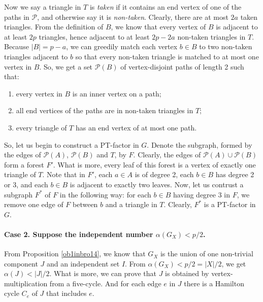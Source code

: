 \documentclass[12pt]{report}
\begin{document}
Now we say a triangle in $T$ is {\em taken} if it contains an end vertex of one of the paths in $\mathcal{P}$, and otherwise say it is {\em non-taken}. Clearly, there are at most $2a$ taken triangles. From the definition of $B$, we know that every vertex of $B$ is adjacent to at least $2p$ triangles, hence adjacent to at least $2p-2a$ non-taken triangles in $T$. Because $|B|=p-a$, we can greedily match each vertex $b\in B$ to two non-taken triangles adjacent to $b$ so that every non-taken triangle is matched to at most one vertex in $B$. So, we get a set $\mathcal{P}(B)$ of vertex-disjoint paths of length 2 such that:
\begin{enumerate}
\item every vertex in $B$ is an inner vertex on a path;
\item all end vertices of the paths are in non-taken triangles in $T$;
\item every triangle of $T$ has an end vertex of at most one path.
\end{enumerate}
So, let us begin to construct a PT-factor in $G$. Denote the subgraph, formed by the edges of $\mathcal{P}(A)$, $\mathcal{P}(B)$ and $T$, by $F$. Clearly, the edges of $\mathcal{P}(A)\cup\mathcal{P}(B)$ form a forest $F'$. What is more, every leaf of this forest is a vertex of exactly one triangle of $T$. Note that in $F'$, each $a\in A$ is of degree 2, each $b\in B$ has degree 2 or 3, and each $b\in B$ is adjacent to exactly two leaves. Now, let us contrust a subgraph $F^*$ of $F$ in the following way: for each $b\in B$ having degree 3 in $F$, we remove one edge of $F$ between $b$ and a triangle in $T$. Clearly, $F^*$ is a PT-factor in $G$.













\paragraph{Case 2. Suppose the independent number $\alpha(G_X)<p/2$.}

From Proposition \ref{ob1inbro14}, we know that $G_X$ is the union of one non-trivial component $J$ and an independent set $I$. From $\alpha(G_X)<p/2=|X|/2$, we get $\alpha(J)<|J|/2$. What is more, we can prove that $J$ is obtained by vertex-multiplication from  a five-cycle. And for each edge $e$ in $J$ there is a Hamilton cycle $C_e$ of $J$ that includes $e$.
\end{document}
